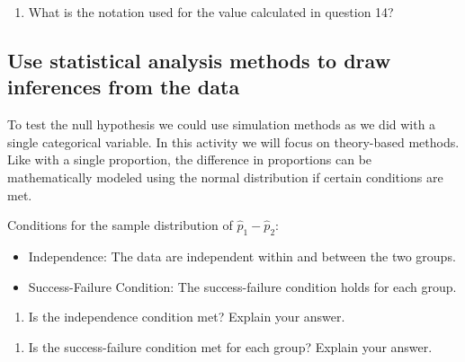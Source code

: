 \documentclass[
]{report}
\providecommand{\tightlist}{%
  \setlength{\itemsep}{0pt}\setlength{\parskip}{0pt}}
\begin{document}
\vspace{1in}

\begin{enumerate}
\def\labelenumi{\arabic{enumi}.}
\setcounter{enumi}{13}
\tightlist
\item
  What is the notation used for the value calculated in question 14?
\end{enumerate}

\vspace{0.5in}
\newpage

\hypertarget{use-statistical-analysis-methods-to-draw-inferences-from-the-data}{%
\subsection*{Use statistical analysis methods to draw inferences from the data}\label{use-statistical-analysis-methods-to-draw-inferences-from-the-data}}

To test the null hypothesis we could use simulation methods as we did with a single categorical variable. In this activity we will focus on theory-based methods. Like with a single proportion, the difference in proportions can be mathematically modeled using the normal distribution if certain conditions are met.

Conditions for the sample distribution of \(\hat{p}_1-\hat{p}_2\):

\begin{itemize}
\item
  Independence: The data are independent within and between the two groups.
\item
  Success-Failure Condition: The success-failure condition holds for each group.
\end{itemize}

\vspace{.25in}

\begin{enumerate}
\def\labelenumi{\arabic{enumi}.}
\setcounter{enumi}{14}
\tightlist
\item
  Is the independence condition met? Explain your answer.
\end{enumerate}

\vspace{1in}

\begin{enumerate}
\def\labelenumi{\arabic{enumi}.}
\setcounter{enumi}{15}
\tightlist
\item
  Is the success-failure condition met for each group? Explain your answer.
\end{enumerate}
\end{document}
